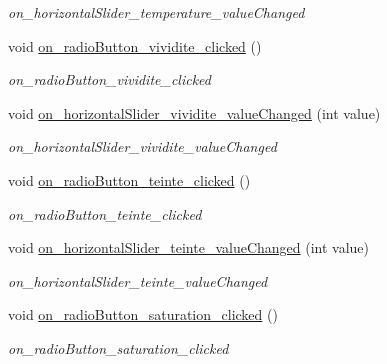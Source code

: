 \begin{DoxyCompactItemize}
\begin{DoxyCompactList}\small\item\em on\+\_\+horizontal\+Slider\+\_\+temperature\+\_\+value\+Changed \end{DoxyCompactList}\item 
\mbox{\label{classAppMainWindow_a182a51eaf4803bb691d951ffb603b9a2}} 
void \hyperlink{classAppMainWindow_a182a51eaf4803bb691d951ffb603b9a2}{on\+\_\+radio\+Button\+\_\+vividite\+\_\+clicked} ()
\begin{DoxyCompactList}\small\item\em on\+\_\+radio\+Button\+\_\+vividite\+\_\+clicked \end{DoxyCompactList}\item 
void \hyperlink{classAppMainWindow_a0de20d498ac66da8fde5776c81b28a2d}{on\+\_\+horizontal\+Slider\+\_\+vividite\+\_\+value\+Changed} (int value)
\begin{DoxyCompactList}\small\item\em on\+\_\+horizontal\+Slider\+\_\+vividite\+\_\+value\+Changed \end{DoxyCompactList}\item 
\mbox{\label{classAppMainWindow_a7452b450b7695b4f796afbaef52fb460}} 
void \hyperlink{classAppMainWindow_a7452b450b7695b4f796afbaef52fb460}{on\+\_\+radio\+Button\+\_\+teinte\+\_\+clicked} ()
\begin{DoxyCompactList}\small\item\em on\+\_\+radio\+Button\+\_\+teinte\+\_\+clicked \end{DoxyCompactList}\item 
void \hyperlink{classAppMainWindow_ac1680ae2d8dfad39c39e18a6ebc39379}{on\+\_\+horizontal\+Slider\+\_\+teinte\+\_\+value\+Changed} (int value)
\begin{DoxyCompactList}\small\item\em on\+\_\+horizontal\+Slider\+\_\+teinte\+\_\+value\+Changed \end{DoxyCompactList}\item 
\mbox{\label{classAppMainWindow_a25e824879de2c21717c875e6392d1eca}} 
void \hyperlink{classAppMainWindow_a25e824879de2c21717c875e6392d1eca}{on\+\_\+radio\+Button\+\_\+saturation\+\_\+clicked} ()
\begin{DoxyCompactList}\small\item\em on\+\_\+radio\+Button\+\_\+saturation\+\_\+clicked \end{DoxyCompactList}\item 

\end{DoxyCompactItemize}

